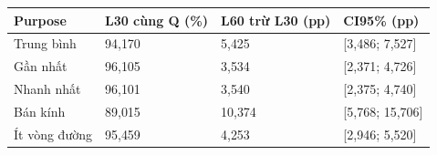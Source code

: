 \par\smallskip\noindent\begin{tabularx}{\linewidth}{@{}P{3cm}XXX@{}}\toprule
\textbf{Purpose} & \textbf{L30 cùng Q (\%)} & \textbf{L60 trừ L30 (pp)} & \textbf{CI95\% (pp)} \\
\midrule
Trung bình & 94{,}170 & 5{,}425 & [3{,}486; 7{,}527] \\
Gần nhất & 96{,}105 & 3{,}534 & [2{,}371; 4{,}726] \\
Nhanh nhất & 96{,}101 & 3{,}540 & [2{,}375; 4{,}740] \\
Bán kính & 89{,}015 & 10{,}374 & [5{,}768; 15{,}706] \\
Ít vòng đường & 95{,}459 & 4{,}253 & [2{,}946; 5{,}520] \\
\bottomrule\end{tabularx}\par\smallskip
